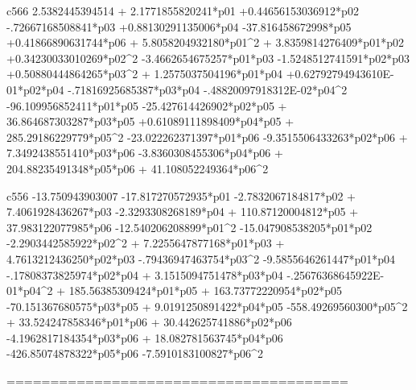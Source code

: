  c566
   2.5382445394514 + 2.1771855820241*p01 +0.44656153036912*p02  -.72667168508841*p03 +0.88130291135006*p04  -37.816458672998*p05 +0.41866890631744*p06 + 5.8058204932180*p01^2 + 3.8359814276409*p01*p02 +0.34230033010269*p02^2  -3.4662654675257*p01*p03  -1.5248512741591*p02*p03 +0.50880444864265*p03^2 + 1.2575037504196*p01*p04 +0.62792794943610E-01*p02*p04  -.71816925685387*p03*p04  -.48820097918312E-02*p04^2  -96.109956852411*p01*p05  -25.427614426902*p02*p05 + 36.864687303287*p03*p05 +0.61089111898409*p04*p05 + 285.29186229779*p05^2  -23.022262371397*p01*p06  -9.3515506433263*p02*p06 + 7.3492438551410*p03*p06  -3.8360308455306*p04*p06 + 204.88235491348*p05*p06 + 41.108052249364*p06^2 
  
 c556
  -13.750943903007  -17.817270572935*p01  -2.7832067184817*p02 + 7.4061928436267*p03  -2.3293308268189*p04 + 110.87120004812*p05 + 37.983122077985*p06  -12.540206208899*p01^2  -15.047908538205*p01*p02  -2.2903442585922*p02^2 + 7.2255647877168*p01*p03 + 4.7613212436250*p02*p03  -.79436947463754*p03^2  -9.5855646261447*p01*p04  -.17808373825974*p02*p04 + 3.1515094751478*p03*p04  -.25676368645922E-01*p04^2 + 185.56385309424*p01*p05 + 163.73772220954*p02*p05  -70.151367680575*p03*p05 + 9.0191250891422*p04*p05  -558.49269560300*p05^2 + 33.524247858346*p01*p06 + 30.442625741886*p02*p06  -4.1962817184354*p03*p06 + 18.082781563745*p04*p06  -426.85074878322*p05*p06  -7.5910183100827*p06^2 
  
 =======================================
